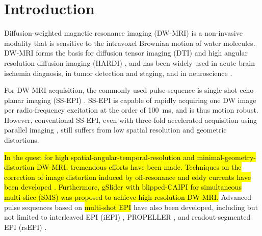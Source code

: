 \documentclass[preprint,12pt,authoryear,review]{elsarticle}
\begin{document}
    \pagebreak
    \linenumbers

    \section{Introduction}
    \label{SEC:Intr}

    Diffusion-weighted magnetic resonance imaging (DW-MRI)
    \citep{lebihan_1986_diff,merboldt_1985_diff} is a non-invasive modality
    that is sensitive to the intravoxel Brownian motion of water molecules.
    DW-MRI forms the basis for diffusion tensor imaging (DTI) \citep{basser_1994_dmri,mori_2001_track}
    and high angular resolution diffusion imaging (HARDI) \citep{tuch_2002_hardi},
    and has been widely used in acute brain ischemia diagnosis, in tumor detection and staging,
    and in neuroscience \citep{jones_2010_diff}.

    For DW-MRI acquisition, the commonly used pulse sequence is
    single-shot echo-planar imaging (SS-EPI) \citep{mansfield_1977_epi}.
    SS-EPI is capable of rapidly acquiring one DW image per radio-frequency excitation
    at the order of \SI{100}{\ms}, and is thus motion robust.
    However, conventional SS-EPI,
    even with three-fold accelerated acquisition \citep{bammer_2001_epi_sense}
    using parallel imaging
    \citep{roemer_1990_pi,ra_1993_sense,pruessmann_1999_sense,griswold_2002_grappa},
    still suffers from low spatial resolution and geometric distortions.

    \hl{In the quest for high spatial-angular-temporal-resolution
    and minimal-geometry-distortion DW-MRI,
    tremendous efforts have been made.
    Techniques on the correction of image distortion
    induced by off-resonance and eddy currents
    have been developed \mbox{\citep{andersson_2003_topup}}.
    Furthermore, gSlider \mbox{\citep{setsompop_2018_gslider}} with
    blipped-CAIPI \mbox{\citep{setsompop_2012_blipped}}
    for simultaneous multi-slice (SMS)
    \mbox{\citep{maudsley_1980_sms,breuer_2005_caipi}}
    was proposed to achieve high-resolution DW-MRI.}
    Advanced pulse sequences based on
    \hl{multi-shot EPI} have also been developed, 
    including but not limited to interleaved EPI (iEPI)
    \citep{butts_1993_iepi},
    PROPELLER \citep{pipe_2002_blade}, and
    readout-segmented EPI (rsEPI)
    \citep{porter_2009_resolve,heidemann_2010_resolve7t}.
\end{document}
